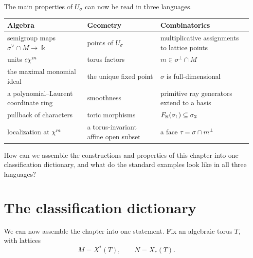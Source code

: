 \begin{threedictionaries}
The main properties of \(U_\sigma\) can now be read in three
languages.

\medskip

\begin{center}
\small
\begin{tabularx}{\linewidth}{@{}
  >{\raggedright\arraybackslash}X
  >{\raggedright\arraybackslash}X
  >{\raggedright\arraybackslash}X@{}}
\toprule
\textbf{Algebra}
&
\textbf{Geometry}
&
\textbf{Combinatorics}
\\
\midrule
semigroup maps
\(\sigma^\vee\cap M\to\Bbbk\)
&
points of \(U_\sigma\)
&
multiplicative assignments to lattice points
\\[1mm]
units \(c\chi^{m}\)
&
torus factors
&
\(m\in\sigma^\perp\cap M\)
\\[1mm]
the maximal monomial ideal
&
the unique fixed point
&
\(\sigma\) is full-dimensional
\\[1mm]
a polynomial--Laurent coordinate ring
&
smoothness
&
primitive ray generators extend to a basis
\\[1mm]
pullback of characters
&
toric morphisms
&
\(F_{\mathbb{R}}(\sigma_1)\subseteq\sigma_2\)
\\[1mm]
localization at \(\chi^{m}\)
&
a torus-invariant affine open subset
&
a face \(\tau=\sigma\cap m^\perp\)
\\
\bottomrule
\end{tabularx}
\end{center}
\end{threedictionaries}

\begin{guidingquestion}
How can we assemble the constructions and properties of this chapter
into one classification dictionary, and what do the standard examples
look like in all three languages?
\end{guidingquestion}


\section{The classification dictionary}
\label{sec:classification-affine-toric-varieties}

We can now assemble the chapter into one statement. Fix an algebraic
torus \(T\), with lattices
\[
M=X^*(T),
\qquad
N=X_*(T).
\]

